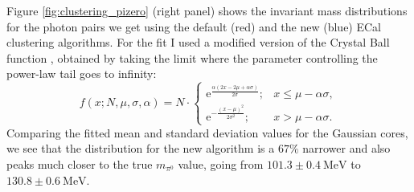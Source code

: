 Figure \ref{fig:clustering_pizero} (right panel) shows the invariant mass distributions for the photon pairs we get using the default (red) and the new (blue) ECal clustering algorithms. For the fit I used a modified version of the Crystal Ball function \cite{Gaiser1982}, obtained by taking the limit where the parameter controlling the power-law tail goes to infinity:
\begin{equation}
	f(x; N, \mu, \sigma, \alpha) = N \cdot
	\left\{
	\begin{array}{ll}
		\mathrm{e}^{\frac{\alpha(2x-2\mu+\alpha\sigma)}{2\sigma}};& x \leq \mu - \alpha\sigma,\\
		\mathrm{e}^{-\frac{(x-\mu)^{2}}{2\sigma^{2}}};& x > \mu - \alpha\sigma.
	\end{array}
	\right.
\end{equation}
Comparing the fitted mean and standard deviation values for the Gaussian cores, we see that the distribution for the new algorithm is a $67\%$ narrower and also peaks much closer to the true $m_{\pi^{0}}$ value, going from $101.3 \pm 0.4 \ \mathrm{MeV}$ to $130.8 \pm 0.6 \ \mathrm{MeV}$.